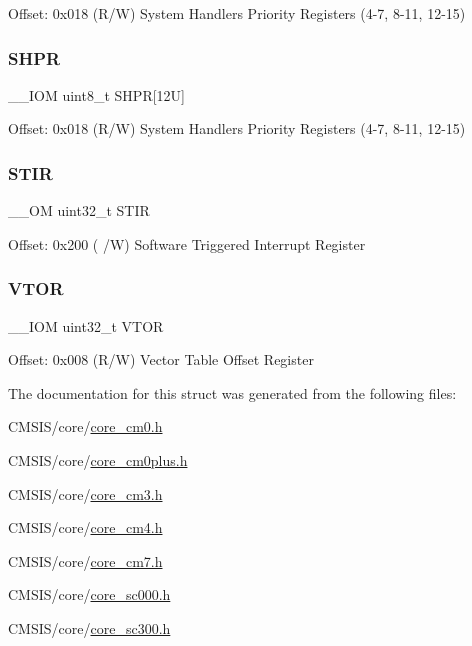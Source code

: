 Offset\+: 0x018 (R/W) System Handlers Priority Registers (4-\/7, 8-\/11, 12-\/15) \mbox{\label{struct_s_c_b___type_a49f5a554705aebf542765b3a38f4feb9}} 
\subsubsection{\texorpdfstring{S\+H\+PR}{SHPR}}
{\footnotesize\ttfamily \+\_\+\+\_\+\+I\+OM uint8\+\_\+t S\+H\+PR\mbox{[}12\+U\mbox{]}}

Offset\+: 0x018 (R/W) System Handlers Priority Registers (4-\/7, 8-\/11, 12-\/15) \mbox{\label{struct_s_c_b___type_ada9cbba14ab1cc3fddd585f870932db8}} 
\subsubsection{\texorpdfstring{S\+T\+IR}{STIR}}
{\footnotesize\ttfamily \+\_\+\+\_\+\+OM uint32\+\_\+t S\+T\+IR}

Offset\+: 0x200 ( /W) Software Triggered Interrupt Register \mbox{\label{struct_s_c_b___type_ae457d2615e203c3d5904a43a1bc9df71}} 
\subsubsection{\texorpdfstring{V\+T\+OR}{VTOR}}
{\footnotesize\ttfamily \+\_\+\+\_\+\+I\+OM uint32\+\_\+t V\+T\+OR}

Offset\+: 0x008 (R/W) Vector Table Offset Register 

The documentation for this struct was generated from the following files\+:\begin{DoxyCompactItemize}
\item 
C\+M\+S\+I\+S/core/\hyperlink{core__cm0_8h}{core\+\_\+cm0.\+h}\item 
C\+M\+S\+I\+S/core/\hyperlink{core__cm0plus_8h}{core\+\_\+cm0plus.\+h}\item 
C\+M\+S\+I\+S/core/\hyperlink{core__cm3_8h}{core\+\_\+cm3.\+h}\item 
C\+M\+S\+I\+S/core/\hyperlink{core__cm4_8h}{core\+\_\+cm4.\+h}\item 
C\+M\+S\+I\+S/core/\hyperlink{core__cm7_8h}{core\+\_\+cm7.\+h}\item 
C\+M\+S\+I\+S/core/\hyperlink{core__sc000_8h}{core\+\_\+sc000.\+h}\item 
C\+M\+S\+I\+S/core/\hyperlink{core__sc300_8h}{core\+\_\+sc300.\+h}\end{DoxyCompactItemize}
